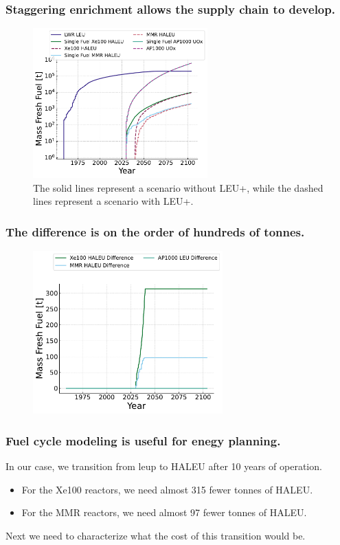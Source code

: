 \documentclass[9pt]{beamer}
\begin{document}
  \begin{frame}
    \frametitle{Staggering enrichment allows the supply chain to develop.}

    \begin{figure}
        \centering
        \includegraphics[width=0.6\textwidth]{images/fresh_fuel.pdf}
        \caption{The solid lines represent a scenario without LEU+, while the dashed lines represent a scenario with LEU+.}
    \end{figure}
  \end{frame}

  \begin{frame}
    \frametitle{The difference is on the order of hundreds of tonnes.}
    \begin{figure}
        \centering
        \includegraphics[width=0.65\textwidth]{images/fresh_fuel_difference.pdf}
    \end{figure}
  \end{frame}

  \begin{frame}
      \frametitle{Fuel cycle modeling is useful for enegy planning.}
      In our case, we transition from \gls{leup} to HALEU after 10 years of operation.
      \begin{itemize}
          \item For the Xe100 reactors, we need almost 315 fewer tonnes of HALEU.
          \item For the MMR reactors, we need almost 97 fewer tonnes of HALEU.
      \end{itemize}
      Next we need to characterize what the cost of this transition would be.
  \end{frame}
\end{document}
